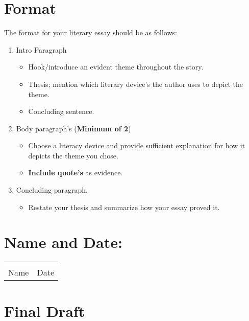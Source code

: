 \documentclass[12pt]{article} %
\begin{document}
  \section{Format}
  The format for your literary essay should be as follows:
  \begin{enumerate}
    \item Intro Paragraph
    \begin{itemize}
      \item Hook/introduce an evident theme throughout the story.
      \item Thesis; mention which literary device's the author uses to depict
      the theme.
      \item Concluding sentence.
    \end{itemize}
    \item Body paragraph's (\textbf{Minimum of 2}) 
      \begin{itemize}
        \item Choose a literacy device and provide sufficient explanation for
        how it depicts the theme you chose.
        \item \textbf{Include quote's} as evidence.
      \end{itemize}
    \item Concluding paragraph. 
    \begin{itemize}
      \item Restate your thesis and summarize how your essay proved it.
    \end{itemize}
  \end{enumerate}


	\section{Name and Date:}

	\begin{center}
	\noindent\begin{tabular}{ll}
		\makebox[3in]{\hrulefill} & \makebox[3in]{\hrulefill}\\
		Name & Date\\[8ex]%
	\end{tabular}
	\end{center}
	\newpage

  \section{Final Draft}
  \newpage
  
  \textit{ }

  \newpage
  
  \textit{ }

  \newpage



  
\end{document}
